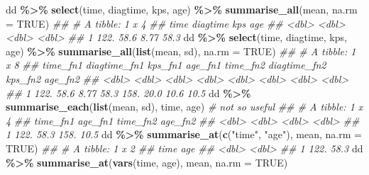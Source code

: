 \documentclass[
]{book}
\newenvironment{Shaded}{\begin{snugshade}}{\end{snugshade}}
\newcommand{\CommentTok}[1]{\textcolor[rgb]{0.56,0.35,0.01}{\textit{#1}}}
\newcommand{\DataTypeTok}[1]{\textcolor[rgb]{0.13,0.29,0.53}{#1}}
\newcommand{\KeywordTok}[1]{\textcolor[rgb]{0.13,0.29,0.53}{\textbf{#1}}}
\newcommand{\NormalTok}[1]{#1}
\newcommand{\OperatorTok}[1]{\textcolor[rgb]{0.81,0.36,0.00}{\textbf{#1}}}
\newcommand{\OtherTok}[1]{\textcolor[rgb]{0.56,0.35,0.01}{#1}}
\newcommand{\StringTok}[1]{\textcolor[rgb]{0.31,0.60,0.02}{#1}}
\begin{document}
\begin{Shaded}
\begin{Highlighting}[]
\NormalTok{dd }\OperatorTok{\%\textgreater{}\%}\StringTok{ }
\StringTok{  }\KeywordTok{select}\NormalTok{(time, diagtime, kps, age) }\OperatorTok{\%\textgreater{}\%}\StringTok{ }
\StringTok{  }\KeywordTok{summarise\_all}\NormalTok{(mean, }\DataTypeTok{na.rm =} \OtherTok{TRUE}\NormalTok{)}
\CommentTok{\#\# \# A tibble: 1 x 4}
\CommentTok{\#\#    time diagtime   kps   age}
\CommentTok{\#\#   \textless{}dbl\textgreater{}    \textless{}dbl\textgreater{} \textless{}dbl\textgreater{} \textless{}dbl\textgreater{}}
\CommentTok{\#\# 1  122.     58.6  8.77  58.3}
\NormalTok{dd }\OperatorTok{\%\textgreater{}\%}\StringTok{ }\KeywordTok{select}\NormalTok{(time, diagtime, kps, age) }\OperatorTok{\%\textgreater{}\%}\StringTok{ }
\StringTok{  }\KeywordTok{summarise\_all}\NormalTok{(}\KeywordTok{list}\NormalTok{(mean, sd), }\DataTypeTok{na.rm =} \OtherTok{TRUE}\NormalTok{)}
\CommentTok{\#\# \# A tibble: 1 x 8}
\CommentTok{\#\#   time\_fn1 diagtime\_fn1 kps\_fn1 age\_fn1 time\_fn2 diagtime\_fn2 kps\_fn2 age\_fn2}
\CommentTok{\#\#      \textless{}dbl\textgreater{}        \textless{}dbl\textgreater{}   \textless{}dbl\textgreater{}   \textless{}dbl\textgreater{}    \textless{}dbl\textgreater{}        \textless{}dbl\textgreater{}   \textless{}dbl\textgreater{}   \textless{}dbl\textgreater{}}
\CommentTok{\#\# 1     122.         58.6    8.77    58.3     158.         20.0    10.6    10.5}
\NormalTok{dd }\OperatorTok{\%\textgreater{}\%}
\StringTok{  }\KeywordTok{summarise\_each}\NormalTok{(}\KeywordTok{list}\NormalTok{(mean, sd), time, age) }\CommentTok{\# not so useful}
\CommentTok{\#\# \# A tibble: 1 x 4}
\CommentTok{\#\#   time\_fn1 age\_fn1 time\_fn2 age\_fn2}
\CommentTok{\#\#      \textless{}dbl\textgreater{}   \textless{}dbl\textgreater{}    \textless{}dbl\textgreater{}   \textless{}dbl\textgreater{}}
\CommentTok{\#\# 1     122.    58.3     158.    10.5}
\NormalTok{dd }\OperatorTok{\%\textgreater{}\%}\StringTok{ }
\StringTok{  }\KeywordTok{summarise\_at}\NormalTok{(}\KeywordTok{c}\NormalTok{(}\StringTok{"time"}\NormalTok{, }\StringTok{"age"}\NormalTok{), mean, }\DataTypeTok{na.rm =} \OtherTok{TRUE}\NormalTok{)}
\CommentTok{\#\# \# A tibble: 1 x 2}
\CommentTok{\#\#    time   age}
\CommentTok{\#\#   \textless{}dbl\textgreater{} \textless{}dbl\textgreater{}}
\CommentTok{\#\# 1  122.  58.3}
\NormalTok{dd }\OperatorTok{\%\textgreater{}\%}\StringTok{ }
\StringTok{  }\KeywordTok{summarise\_at}\NormalTok{(}\KeywordTok{vars}\NormalTok{(time, age), mean, }\DataTypeTok{na.rm =} \OtherTok{TRUE}\NormalTok{)}

\end{Highlighting}
\end{Shaded}
\end{document}
